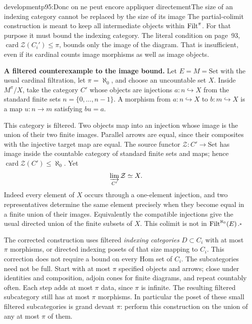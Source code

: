 \begin{dcomment}{development}{p95:Donc on ne peut encore appliquer directement}{The size of an indexing category cannot be replaced by the size of its image}
The partial-colimit construction is meant to keep all intermediate objects within $\mathrm{Filt}^\pi$. For that purpose it must bound the indexing category. The literal condition on page~93, $\operatorname{card}\mathcal Z(C_i')\leq\pi$, bounds only the image of the diagram. That is insufficient, even if its cardinal counts image morphisms as well as image objects.

\textbf{A filtered counterexample to the image bound.}\ours
Let $E=M=\mathrm{Set}$ with the usual cardinal filtration, let $\pi=\aleph_0$, and choose an uncountable set $X$. Inside $M^\pi/X$, take the category $C'$ whose objects are injections $a:n\hookrightarrow X$ from the standard finite sets $n=\{0,\ldots,n-1\}$. A morphism from $a:n\hookrightarrow X$ to $b:m\hookrightarrow X$ is a map $u:n\to m$ satisfying $bu=a$.

This category is filtered. Two objects map into an injection whose image is the union of their two finite images. Parallel arrows are equal, since their composites with the injective target map are equal. The source functor $\mathcal Z:C'\to\mathrm{Set}$ has image inside the countable category of standard finite sets and maps; hence $\operatorname{card}\mathcal Z(C')\leq\aleph_0$. Yet
\[
 \varinjlim_{C'}\mathcal Z\simeq X.
\]
Indeed every element of $X$ occurs through a one-element injection, and two representatives determine the same element precisely when they become equal in a finite union of their images. Equivalently the compatible injections give the usual directed union of the finite subsets of $X$. This colimit is not in $\mathrm{Filt}^{\aleph_0}(E)$.\hfill$\square$

The corrected construction uses filtered \emph{indexing categories} $D\subset C_i$ with at most $\pi$ morphisms, or directed indexing posets of that size mapping to $C_i$. This correction does not require a bound on every Hom set of $C_i$. The subcategories need not be full. Start with at most $\pi$ specified objects and arrows; close under identities and composition, adjoin cones for finite diagrams, and repeat countably often. Each step adds at most $\pi$ data, since $\pi$ is infinite. The resulting filtered subcategory still has at most $\pi$ morphisms. In particular the poset of these small filtered subcategories is grand devant $\pi$: perform this construction on the union of any at most $\pi$ of them.


\end{dcomment}
